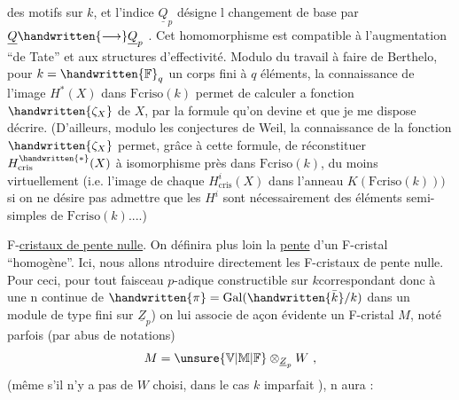 
des motifs  sur $k$, et l'indice $\underline{Q}_p$ désigne l  changement de base par $\underline{Q}\handwritten{\longrightarrow}\underline{Q}_p$ . Cet homomorphisme est compatible à l'augmentation ``de Tate'' et aux structures d'effectivité. Modulo du travail à faire de Berthelo, pour $k=\handwritten{\mathbb{F}}_q$ un corps fini à $q$ éléments, la connaissance de l'image  $H^*(X)$ dans $\mathrm{Fcriso}(k)$ permet de calculer a fonction $\handwritten{\zeta_X}$ de $X$, par la formule qu'on devine et que je me dispose décrire. (D'ailleurs, modulo les conjectures de Weil, la connaissance de la fonction $\handwritten{\zeta_X}$ permet, grâce à cette formule, de réconstituer $H^{\handwritten{*}}_{\mathrm{cris}}(X)$ à isomorphisme près dans $\mathrm{Fcriso}(k)$, du moins virtuellement (i.e. l'image de chaque $H^i_{\mathrm{cris}}(X)$ dans l'anneau $K(\mathrm{Fcriso}(k)))$ si on ne désire pas admettre que  les $H^i$ sont nécessairement des éléments semi-simples de $\mathrm{Fcriso}(k)$....)

 F-\uline{cristaux de  pente nulle}. On définira plus loin la \uline{pente} d'un F-cristal ``homogène''. Ici, nous allons ntroduire directement les F-cristaux de pente nulle. Pour ceci, pour tout faisceau $p$-adique constructible  sur $k$\handwritten{(}correspondant donc à une n continue de $\handwritten{\pi}=\operatorname{Gal}(\handwritten{\bar{k}}/k)$ dans un module de type fini sur $\underline{Z}_p$) on lui associe de açon évidente un F-cristal $M$, noté parfois (par abus de notations)
\[
M=\unsure{\mathbb{V}|\mathbb{M}|\mathbb{F}}\otimes_{\underline{Z}_p}W\ ,
\]
(même s'il n'y a pas de $W$ choisi, dans le cas $k$ imparfait \handwritten{!} ), n aura :

